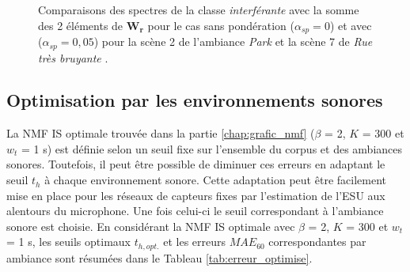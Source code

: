 \begin{figure}[h!]
\centering
{}%
\qquad
{}%
\caption{Comparaisons des spectres de la classe \textit{interférante} avec la somme des 2 éléments de $\mathbf{W_r}$ pour le cas sans pondération ($\alpha_{sp}= 0$) et avec ($\alpha_{sp} = 0,05$) pour la scène 2 de l'ambiance \textit{Park}  et la scène 7 de \textit{Rue très bruyante} .}
\label{fig:grafic_sp}
\end{figure}


\subsection{Optimisation par les environnements sonores}\label{part:optimisationESU}


La NMF IS optimale trouvée dans la partie \ref{chap:grafic_nmf} ($\beta$ = 2, $K$ = 300 et $w_t$ = 1 s) est définie selon un seuil fixe sur l'ensemble du corpus et des ambiances sonores. Toutefois, il peut être possible de diminuer ces erreurs en adaptant le seuil $t_h$ à chaque environnement sonore. 
Cette adaptation peut être facilement mise en place pour les réseaux de capteurs fixes par l'estimation de l'ESU aux alentours du microphone. Une fois celui-ci le seuil correspondant à l'ambiance sonore est choisie. 
En considérant la NMF IS optimale avec $\beta$ = 2, $K$ = 300 et $w_t$ = 1 s, les seuils optimaux $t_{h,opt.}$ et les erreurs $MAE_{60}$ correspondantes par ambiance sont résumées dans le Tableau \ref{tab:erreur_optimise}.

